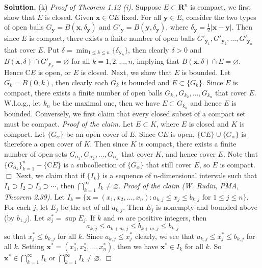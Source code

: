 \documentclass[12pt]{article}
\theoremstyle{definition}
\begin{document}
\smallskip
\noindent\textbf{Solution.}\quad
(k) \textit{Proof of Theorem 1.12 (i).} Suppose $E\subset\mathbf{R}^n$ is compact, we first show that $E$ is closed. Given $\mathbf{x}\in\mathrm{C}E$ fixed. For all $\mathbf{y}\in E$, consider the two types of open balls $G_{\mathbf{y}}=B(\mathbf{x},\delta_{\mathbf{y}})$ and $G'_{\mathbf{y}}=B(\mathbf{y},\delta_{\mathbf{y}})$, where $\delta_{\mathbf{y}}=\frac{1}{2}\left\vert\mathbf{x}-\mathbf{y}\right\vert$. Then since $E$ is compact, there exists a finite number of open balls $G'_{\mathbf{y}_1},G'_{\mathbf{y}_2},\ldots,G'_{\mathbf{y}_n}$ that cover $E$. Put $\delta=\min_{1\le k\le n}\{\delta_{\mathbf{y}_k}\}$, then clearly $\delta>0$ and $B(\mathbf{x},\delta)\cap G'_{\mathbf{y}_k}=\varnothing$ for all $k=1,2,\ldots,n$, implying that $B(\mathbf{x},\delta)\cap E=\varnothing$. Hence $\mathrm{C}E$ is open, or $E$ is closed. Next, we show that $E$ is bounded. Let $G_k=B(\mathbf{0},k)$, then clearly each $G_k$ is bounded and  $E\subset\{G_k\}$. Since $E$ is compact, there exists a finite number of open balls $G_{k_1},G_{k_2},\ldots,G_{k_n}$ that cover $E$. W.l.o.g., let $k_n$ be the maximal one, then we have $E\subset G_{k_n}$ and hence $E$ is bounded. Conversely, we first claim that every closed subset of a compact set must be compact.
\textit{Proof of the claim.} Let $E\subset K$, where $E$ is closed and $K$ is compact. Let $\{G_\alpha\}$ be an open cover of $E$. Since $\mathrm{C}E$ is open, $\{\mathrm{C}E\}\cup\{G_\alpha\}$ is therefore a open cover of $K$. Then since $K$ is compact, there exists a finite number of open sets $G_{\alpha_1},G_{\alpha_2},\ldots, G_{\alpha_n}$ that cover $K$, and hence cover $E$. Note that $\{G_{\alpha_k}\}_{k=1}^n-\{\mathrm{C}E\}$ is a subcollection of $\{G_\alpha\}$ that still cover $E$, so $E$ is compact. $\Box$
Next, we claim that if $\{I_k\}$ is a sequence of $n$-dimensional intervals such that $I_1\supset I_2\supset I_3\supset \cdots$, then $\bigcap_{k=1}^\infty I_k\ne\varnothing$.
\textit{Proof of the claim (W. Rudin, PMA, Theorem 2.39).} Let $I_k=\{\mathbf{x}=(x_1,x_2,\ldots,x_n):a_{k,j}\le x_j\le b_{k,j}\mbox{ for }1\le j\le n\}$. For each $j$, let $E_j$ be the set of all $a_{k,j}$. Then $E_j$ is nonempty and bounded above (by $b_{1,j}$). Let $x_j^\ast=\sup E_j$. If $k$ and $m$ are positive integers, then
$$
a_{k,j}\le a_{k+m,j}\le b_{k+m,j}\le b_{k,j}
$$
so that $x_j^\ast\le b_{k,j}$ for all $k$. Since $a_{k,j}\le x_j^\ast$ clearly, we see that $a_{k,j}\le x_j^\ast\le b_{k,j}$ for all $k$. Setting $\mathbf{x}^\ast=(x_1^\ast,x_2^\ast,\ldots,x_n^\ast)$, then we have $\mathbf{x}^\ast\in I_k$ for all $k$. So $\mathbf{x}^\ast\in\bigcap_{k=1}^\infty I_k$ or $\bigcap_{k=1}^\infty I_k\ne\varnothing$. $\Box$
\end{document}
